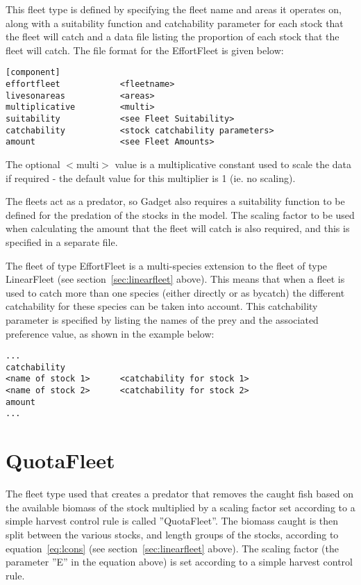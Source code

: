 \documentclass[10pt,twoside]{book}
\begin{document}
\bigskip
This fleet type is defined by specifying the fleet name and areas it operates on, along with a suitability function and catchability parameter for each stock that the fleet will catch and a data file listing the proportion of each stock that the fleet will catch.  The file format for the EffortFleet is given below:

{\small\begin{verbatim}
[component]
effortfleet            <fleetname>
livesonareas           <areas>
multiplicative         <multi>
suitability            <see Fleet Suitability>
catchability           <stock catchability parameters>
amount                 <see Fleet Amounts>
\end{verbatim}}

The optional $<$multi$>$ value is a multiplicative constant used to scale the data if required - the default value for this multiplier is 1 (ie. no scaling).

\bigskip
The fleets act as a predator, so Gadget also requires a suitability function to be defined for the predation of the stocks in the model.  The scaling factor to be used when calculating the amount that the fleet will catch is also required, and this is specified in a separate file.

\bigskip
The fleet of type EffortFleet is a multi-species extension to the fleet of type LinearFleet (see section~\ref{sec:linearfleet} above).  This means that when a fleet is used to catch more than one species (either directly or as bycatch) the different catchability for these species can be taken into account.  This catchability parameter is specified by listing the names of the prey and the associated preference value, as shown in the example below:

{\small\begin{verbatim}
...
catchability
<name of stock 1>      <catchability for stock 1>
<name of stock 2>      <catchability for stock 2>
amount
...
\end{verbatim}}

\section{QuotaFleet}\label{sec:quotafleet}
The fleet type used that creates a predator that removes the caught fish based on the available biomass of the stock multiplied by a scaling factor set according to a simple harvest control rule is called ''QuotaFleet''.  The biomass caught is then split between the various stocks, and length groups of the stocks, according to equation~\ref{eq:lcons} (see section~\ref{sec:linearfleet} above).  The scaling factor (the parameter ''E'' in the equation above) is set according to a simple harvest control rule.
\end{document}

